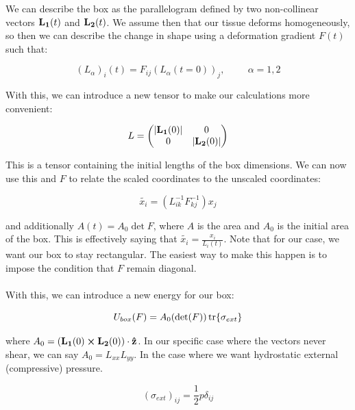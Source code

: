 \documentclass[12pt]{article}
\begin{document}
We can describe the box as the parallelogram defined by two non-collinear vectors $\vb{L_1}(t)$ and $\vb{L_2}(t)$. We assume then that our tissue deforms homogeneously, so then we can describe the change in shape using a deformation gradient $F(t)$ such that:
\begin{center}
\begin{equation}
\label{eqn9}
(L_\alpha)_i(t) = F_{ij} (L_\alpha(t = 0))_j,\hspace{1cm} \alpha = 1,2
\end{equation}
\end{center} 
With this, we can introduce a new tensor to make our calculations more convenient:
\begin{center}
\begin{equation}
\label{eqn10}
L = 
\begin{pmatrix}
|\vb{L_1}(0)| & 0\\
0 & |\vb{L_2}(0)|\\  
\end{pmatrix}
\end{equation}
\end{center}
This is a tensor containing the initial lengths of the box dimensions. We can now use this and $F$ to relate the scaled coordinates to the unscaled coordinates:
\begin{center}
\begin{equation}
\label{eqn: coords}
\tilde{x_i} = (L_{ik}^{-1} F_{kj}^{-1})x_j
\end{equation}
\end{center}
and additionally $A(t) = A_0 \det F$, where $A$ is the area and $A_0$ is the initial area of the box. This is effectively saying that $\tilde{x_i} = \frac{x_i} {L_i(t)}$. Note that for our case, we want our box to stay rectangular. The easiest way to make this happen is to impose the condition that $F$ remain diagonal. \\ \\
With this, we can introduce a new energy for our box:
\begin{center}
\begin{equation}
\label{eqn: boxenergy}
U_{box}(F) = A_0 (\det(F)) \tr{\sigma_{ext}}
\end{equation}
\end{center}
where $A_0 = (\vb{L_1} (0)\cross \vb{L_2} (0)) \cdot \vu{z}$. In our specific case where the vectors never shear, we can say $A_0 = L_{xx} L_{yy}$. In the case where we want hydrostatic external (compressive) pressure.
\begin{center}
\begin{equation}
\label{eqn: hydrostatic_stress}
(\sigma_{ext})_{ij} = \frac{1}{2} p \delta_{ij} 
\end{equation}
\end{center}
\end{document}
